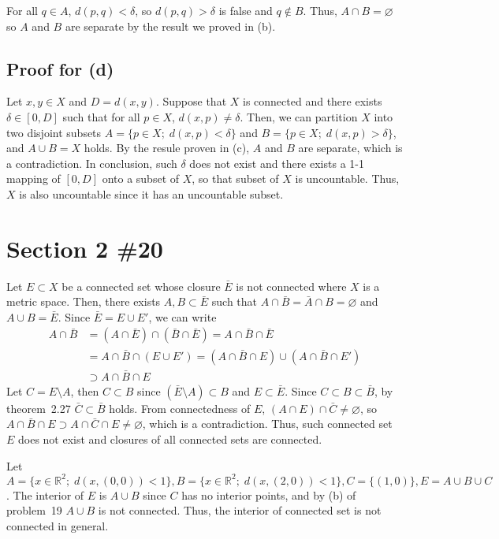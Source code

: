 \documentclass{scrartcl}
\begin{document}
For all \(q \in A\), \(d(p, q) < \delta\), so \(d(p, q) > \delta\) is false and \(q \not \in B\).
Thus, \(A \cap B = \varnothing\) so \(A\) and \(B\) are separate by the result we proved in (b).

\subsection{Proof for (d)}
Let \(x, y \in X\) and \(D = d(x, y)\).
Suppose that \(X\) is connected and there exists \(\delta \in [0, D]\) such that for all \(p \in X\), \(d(x, p) \not = \delta\).
Then, we can partition \(X\) into two disjoint subsets \(A = \{p \in X;\; d(x, p) < \delta\}\) and \(B = \{p \in X;\; d(x, p) > \delta\}\), and \(A \cup B = X\) holds.
By the resule proven in (c), \(A\) and \(B\) are separate, which is a contradiction.
In conclusion, such \(\delta\) does not exist and there exists a 1-1 mapping of \([0, D]\) onto a subset of \(X\), so that subset of \(X\) is uncountable.
Thus, \(X\) is also uncountable since it has an uncountable subset.

\section{Section 2 \#20}
Let \(E \subset X\) be a connected set whose closure \(\bar{E}\) is not connected where \(X\) is a metric space.
Then, there exists \(A, B \subset \bar{E}\) such that \(A \cap \bar{B} = \bar{A} \cap B = \varnothing\) and \(A \cup B = \bar{E}\).
Since \(\bar{E} = E \cup E'\), we can write
\begin{align*}
  A \cap \bar{B} &= (A \cap \bar{E}) \cap (\bar{B} \cap \bar{E}) = A \cap \bar{B} \cap \bar{E} \\
                 &= A \cap \bar{B} \cap (E \cup E') = (A \cap \bar{B} \cap E) \cup (A \cap \bar{B} \cap E') \\
                 &\supset A \cap \bar{B} \cap E
\end{align*}
Let \(C = E \setminus A\), then \(C \subset B\) since \((\bar{E} \setminus A) \subset B\) and \(E \subset \bar{E}\).
Since \(C \subset B \subset \bar{B}\), by theorem~2.27 \(\bar{C} \subset \bar{B}\) holds.
From connectedness of \(E\), \((A \cap E) \cap \bar{C} \not = \varnothing\), so \(A \cap \bar{B} \cap E \supset A \cap \bar{C} \cap E \not = \varnothing\), which is a contradiction.
Thus, such connected set \(E\) does not exist and closures of all connected sets are connected.

Let \(A = \{x \in \mathbb{R}^2;\; d(x, (0, 0)) < 1\}, B = \{x \in \mathbb{R}^2;\; d(x, (2, 0)) < 1\}, C = \{(1, 0)\}, E = A \cup B \cup C\).
The interior of \(E\) is \(A \cup B\) since \(C\) has no interior points, and by (b) of problem~19 \(A \cup B\) is not connected.
Thus, the interior of connected set is not connected in general.
\end{document}
